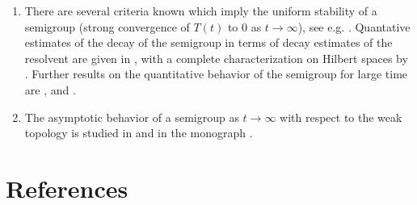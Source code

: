 \begin{enumerate}
\item 
There are several criteria known which imply the uniform stability of a semigroup (\ie  strong convergence of $T(t)$ to $0$ as $t \rightarrow \infty$), see e.g. \textcite{zbmath05136549}.
Quantative estimates of the decay of the semigroup in terms of decay estimates of the resolvent are given in \textcite{zbmath05562661}, with a complete characterization on Hilbert spaces by \textcite{zbmath05700559}. 
Further results on the quantitative behavior of the semigroup for large time are \textcite{zbmath06575587}, \textcite{zbmath08146690} and 
\textcite{zbmath07114750}.


\item
The asymptotic behavior of a semigroup as $t \rightarrow \infty$  with respect to the weak topology is studied in 
\textcite{zbmath05491771} and in the monograph \textcite{zbmath05625330}.

\end{enumerate}
\section*{References}
{\RaggedRight
  \printbibliography[heading=none]
 }